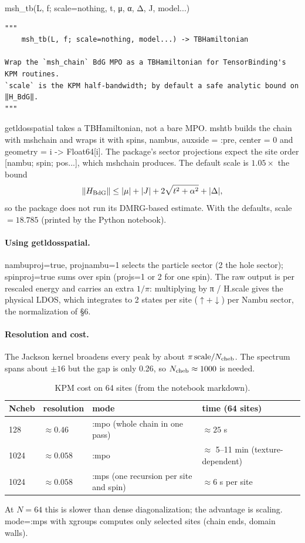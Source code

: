 \documentclass[11pt]{article}
\newcommand{\codeus}{\textunderscore\allowbreak}
\renewcommand{\code}[1]{{\ttfamily\let\_\codeus #1}}
\begin{document}
\begin{function}{msh\_tb(L, f; scale=nothing, t, μ, α, Δ, J, model...)}
\begin{Verbatim}
"""
    msh_tb(L, f; scale=nothing, model...) -> TBHamiltonian

Wrap the `msh_chain` BdG MPO as a TBHamiltonian for TensorBinding's KPM routines.
`scale` is the KPM half-bandwidth; by default a safe analytic bound on ‖H_BdG‖.
"""
\end{Verbatim}
\code{get\_ldos\_spatial} takes a \code{TBHamiltonian}, not a bare MPO. \code{msh\_tb} builds the chain with \code{msh\_chain} and wraps it with \code{spin\_s}, \code{nambu\_s}, \code{aux\_side = :pre}, \code{center = 0} and \code{geometry = i -> Float64[i]}. The package's sector projections expect the site order \code{[nambu; spin; pos...]}, which \code{msh\_chain} produces. The default scale is $1.05\times$ the bound
\[
\|H_{\rm BdG}\|\le|\mu|+|J|+2\sqrt{t^2+\alpha^2}+|\Delta|,
\]
so the package does not run its DMRG-based estimate. With the defaults, scale $=18.785$ (printed by the Python notebook).
\end{function}

\paragraph{Using \code{get\_ldos\_spatial}.} \code{nambu\_proj=true, proj\_nambu=1} selects the particle sector (\code{2} the hole sector); \code{spin\_proj=true} sums over spin (\code{proj\_s=1} or \code{2} for one spin). The raw output is per rescaled energy and carries an extra $1/\pi$: multiplying by \code{π / H.scale} gives the physical LDOS, which integrates to 2 states per site ($\uparrow+\downarrow$) per Nambu sector, the normalization of §6.

\paragraph{Resolution and cost.} The Jackson kernel broadens every peak by about $\pi\,\text{scale}/N_{\rm cheb}$. The spectrum spans about $\pm16$ but the gap is only 0.26, so $N_{\rm cheb}\approx1000$ is needed.

\begin{table}[H]
\centering\small
\caption{KPM cost on 64 sites (from the notebook markdown).}
\begin{tabular}{llll}
\toprule
\code{Ncheb} & resolution & mode & time (64 sites)\\
\midrule
128 & $\approx0.46$ & \code{:mpo} (whole chain in one pass) & $\approx25$ s\\
1024 & $\approx0.058$ & \code{:mpo} & $\approx$ 5–11 min (texture-dependent)\\
1024 & $\approx0.058$ & \code{:mps} (one recursion per site and spin) & $\approx6$ s per site\\
\bottomrule
\end{tabular}
\end{table}
At $N=64$ this is slower than dense diagonalization; the advantage is scaling. \code{mode=:mps} with \code{x\_groups} computes only selected sites (chain ends, domain walls).
\end{document}

